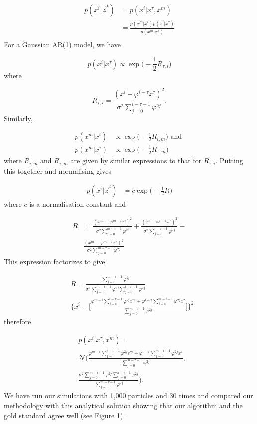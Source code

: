 \begin{align*}
   p(x^i | \vec{z}^t)  &= p(x^i | x^{\tau}, x^m) \\
    &= \frac{p(x^m | x^i) p(x^i | x^{\tau})}{p(x^m | x^{\tau})} \\
\end{align*}
For a Gaussian AR(1) model, we have 

\[
p(x^i | x^{\tau}) \propto \exp\Big(-\frac{1}{2} R_{\tau,i}\Big)
\]
where

\[
    R_{\tau,i} = \frac{(x^i - \varphi^{i-\tau} x^{\tau})^2}{\sigma^2 \sum_{j=0}^{i-\tau-1} \varphi^{2j}}.
\]
Similarly,

\begin{align*}
    p(x^m | x^i) &\propto \exp\Big(-\frac{1}{2} R_{i,m}\Big) \mbox{ and } \\
    p(x^m | x^{\tau}) &\propto \exp\Big(-\frac{1}{2} R_{\tau,m}\Big)
\end{align*}
where $R_{i,m}$ and $R_{\tau,m}$ are given by similar expressions to that for $R_{\tau,i}$. Putting this together and normalising gives 

\begin{align*}
   p(x^i | \vec{z}^t)  &= c \exp\Big(-\frac{1}{2} R\Big)
\end{align*}
where $c$ is a normalisation constant and

\begin{align*}
    R &= \frac{(x^m - \varphi^{m-i} x^i)^2}{\sigma^2 \sum_{j=0}^{m-i-1} \varphi^{2j}} + \frac{(x^i - \varphi^{i-\tau} x^\tau)^2}{\sigma^2 \sum_{j=0}^{i-\tau-1} \varphi^{2j}} - \\
    &\frac{(x^m - \varphi^{m -\tau} x^\tau)^2}{\sigma^2 \sum_{j=0}^{m-\tau-1} \varphi^{2j}}
\end{align*}
This expression factorizes to give

\begin{align*}
    &R = \frac{\sum_{j=0}^{m-\tau - 1} \varphi^{2j}}{\sigma^2 \sum_{j=0}^{m-i-1} \varphi^{2j} \sum_{j=0}^{i-\tau-1} \varphi^{2j}} \\
    &\Bigg\{ x^i - \Bigg[\frac{\varphi^{m-i} \sum_{j=0}^{i-\tau-1} \varphi^{2j} x^{m} + \varphi^{i - \tau} \sum_{j=0}^{m - i - 1} \varphi^{2j} x^{\tau}}{\sum_{j=0}^{m-\tau-1} \varphi^{2j}}\Bigg] \Bigg\}^2
\end{align*}
therefore

\begin{align*}
      &p(x^i | x^{\tau}, x^{m}) = \\
      &\mathcal{N} \Bigg(\frac{\varphi^{m-i} \sum_{j=0}^{i-\tau-1} \varphi^{2j} x^{m} + \varphi^{i-\tau} \sum_{j=0}^{m-i-1} \varphi^{2j} x^{\tau}}{\sum_{j=0}^{m-\tau -1} \varphi^{2j}}, \\ &\frac{\sigma^2 \sum_{j=0}^{m-i-1} \varphi^{2j} \sum_{j=0}^{i-\tau - 1} \varphi^{2j}}{\sum_{j=0}^{m-\tau - 1} \varphi^{2j}} \Bigg).
\end{align*}
We have run our simulations with 1,000 particles and 30 times and compared our methodology with this analytical solution showing that our algorithm and the gold standard agree well (see Figure 1).





